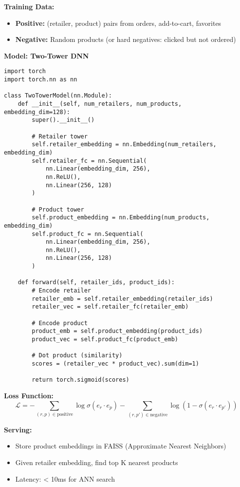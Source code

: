\documentclass[11pt,letterpaper]{article}
\begin{document}
\textbf{Training Data:}
\begin{itemize}
    \item \textbf{Positive:} (retailer, product) pairs from orders, add-to-cart, favorites
    \item \textbf{Negative:} Random products (or hard negatives: clicked but not ordered)
\end{itemize}

\textbf{Model: Two-Tower DNN}

\begin{lstlisting}
import torch
import torch.nn as nn

class TwoTowerModel(nn.Module):
    def __init__(self, num_retailers, num_products, embedding_dim=128):
        super().__init__()

        # Retailer tower
        self.retailer_embedding = nn.Embedding(num_retailers, embedding_dim)
        self.retailer_fc = nn.Sequential(
            nn.Linear(embedding_dim, 256),
            nn.ReLU(),
            nn.Linear(256, 128)
        )

        # Product tower
        self.product_embedding = nn.Embedding(num_products, embedding_dim)
        self.product_fc = nn.Sequential(
            nn.Linear(embedding_dim, 256),
            nn.ReLU(),
            nn.Linear(256, 128)
        )

    def forward(self, retailer_ids, product_ids):
        # Encode retailer
        retailer_emb = self.retailer_embedding(retailer_ids)
        retailer_vec = self.retailer_fc(retailer_emb)

        # Encode product
        product_emb = self.product_embedding(product_ids)
        product_vec = self.product_fc(product_emb)

        # Dot product (similarity)
        scores = (retailer_vec * product_vec).sum(dim=1)

        return torch.sigmoid(scores)
\end{lstlisting}

\textbf{Loss Function:}
\begin{equation}
\mathcal{L} = -\sum_{(r,p) \in \text{positive}} \log \sigma(e_r \cdot e_p) - \sum_{(r,p') \in \text{negative}} \log(1 - \sigma(e_r \cdot e_{p'}))
\end{equation}

\textbf{Serving:}
\begin{itemize}
    \item Store product embeddings in FAISS (Approximate Nearest Neighbors)
    \item Given retailer embedding, find top K nearest products
    \item Latency: < 10ms for ANN search
\end{itemize}
\end{document}
